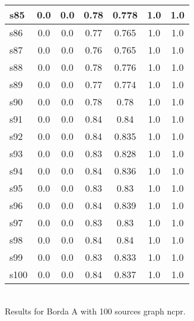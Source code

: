 \documentclass{article}
\begin{document}
\begin{tabular}{|l|c|c|c|c|c|c|}
\hline
s85 &0.0 & 0.0 & 0.78 & 0.778 & 1.0 & 1.0\\
\hline
s86 &0.0 & 0.0 & 0.77 & 0.765 & 1.0 & 1.0\\
\hline
s87 &0.0 & 0.0 & 0.76 & 0.765 & 1.0 & 1.0\\
\hline
s88 &0.0 & 0.0 & 0.78 & 0.776 & 1.0 & 1.0\\
\hline
s89 &0.0 & 0.0 & 0.77 & 0.774 & 1.0 & 1.0\\
\hline
s90 &0.0 & 0.0 & 0.78 & 0.78 & 1.0 & 1.0\\
\hline
s91 &0.0 & 0.0 & 0.84 & 0.84 & 1.0 & 1.0\\
\hline
s92 &0.0 & 0.0 & 0.84 & 0.835 & 1.0 & 1.0\\
\hline
s93 &0.0 & 0.0 & 0.83 & 0.828 & 1.0 & 1.0\\
\hline
s94 &0.0 & 0.0 & 0.84 & 0.836 & 1.0 & 1.0\\
\hline
s95 &0.0 & 0.0 & 0.83 & 0.83 & 1.0 & 1.0\\
\hline
s96 &0.0 & 0.0 & 0.84 & 0.839 & 1.0 & 1.0\\
\hline
s97 &0.0 & 0.0 & 0.83 & 0.83 & 1.0 & 1.0\\
\hline
s98 &0.0 & 0.0 & 0.84 & 0.84 & 1.0 & 1.0\\
\hline
s99 &0.0 & 0.0 & 0.83 & 0.833 & 1.0 & 1.0\\
\hline
s100 &0.0 & 0.0 & 0.84 & 0.837 & 1.0 & 1.0\\
\hline
\end{tabular}\\

\noindent Results for Borda A with 100 sources graph ncpr.
\end{document}
